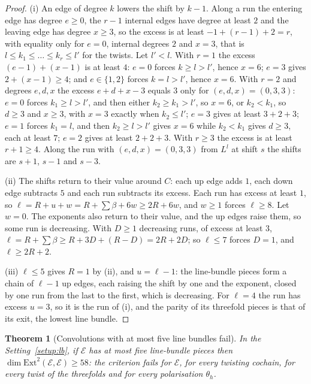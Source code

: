 \documentclass[11pt,reqno]{amsart}
\numberwithin{equation}{section}
\theoremstyle{plain}
\newtheorem{theorem}{Theorem}[section]
\theoremstyle{definition}
\newcommand{\Ext}{\mathrm{Ext}}
\begin{document}
\begin{proof}
(i) An edge of degree $k$ lowers the shift by $k-1$. Along a run the entering edge has degree $e\ge0$, the $r-1$ internal edges have degree at least $2$ and the leaving edge has degree $x\ge3$, so the excess is at least $-1+(r-1)+2=r$, with equality only for $e=0$, internal degrees $2$ and $x=3$, that is $l\le k_{1}\le\dots\le k_{r}\le l'$ for the twists. Let $l'<l$. With $r=1$ the excess $(e-1)+(x-1)$ is at least $4$: $e=0$ forces $k\ge l>l'$, hence $x=6$; $e=3$ gives $2+(x-1)\ge4$; and $e\in\{1,2\}$ forces $k=l>l'$, hence $x=6$. With $r=2$ and degrees $e,d,x$ the excess $e+d+x-3$ equals $3$ only for $(e,d,x)=(0,3,3)$: $e=0$ forces $k_{1}\ge l>l'$, and then either $k_{2}\ge k_{1}>l'$, so $x=6$, or $k_{2}<k_{1}$, so $d\ge3$ and $x\ge3$, with $x=3$ exactly when $k_{2}\le l'$; $e=3$ gives at least $3+2+3$; $e=1$ forces $k_{1}=l$, and then $k_{2}\ge l>l'$ gives $x=6$ while $k_{2}<k_{1}$ gives $d\ge3$, each at least $7$; $e=2$ gives at least $2+2+3$. With $r\ge3$ the excess is at least $r+1\ge4$. Along the run with $(e,d,x)=(0,3,3)$ from $L^{l}$ at shift $s$ the shifts are $s+1$, $s-1$ and $s-3$.

(ii) The shifts return to their value around $C$: each up edge adds $1$, each down edge subtracts $5$ and each run subtracts its excess. Each run has excess at least $1$, so $\ell=R+u+w=R+\sum\beta+6w\ge2R+6w$, and $w\ge1$ forces $\ell\ge8$. Let $w=0$. The exponents also return to their value, and the up edges raise them, so some run is decreasing. With $D\ge1$ decreasing runs, of excess at least $3$, $\ell=R+\sum\beta\ge R+3D+(R-D)=2R+2D$; so $\ell\le7$ forces $D=1$, and $\ell\ge2R+2$.

(iii) $\ell\le5$ gives $R=1$ by (ii), and $u=\ell-1$: the line-bundle pieces form a chain of $\ell-1$ up edges, each raising the shift by one and the exponent, closed by one run from the last to the first, which is decreasing. For $\ell=4$ the run has excess $u=3$, so it is the run of (i), and the parity of its threefold pieces is that of its exit, the lowest line bundle.
\end{proof}

\begin{theorem}[Convolutions with at most five line bundles fail]\label{thm:fivebundles}
In the Setting~\ref{setup:lb}, if $\mathcal{E}$ has at most five line-bundle pieces then $\dim\Ext^{2}(\mathcal{E},\mathcal{E})\ge58$: the criterion fails for $\mathcal{E}$, for every twisting cochain, for every twist of the threefolds and for every polarisation $\theta_{h}$.
\end{theorem}
\end{document}

